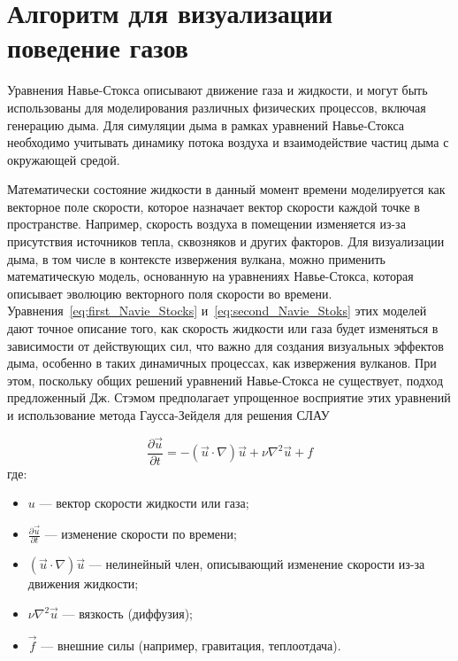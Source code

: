 \section{Алгоритм для визуализации поведение газов}
Уравнения Навье-Стокса описывают движение газа и жидкости, и могут быть использованы для моделирования различных физических процессов, включая генерацию дыма. Для симуляции дыма в рамках уравнений Навье-Стокса необходимо учитывать динамику потока воздуха и взаимодействие частиц дыма с окружающей средой.

Математически состояние жидкости в данный момент времени моделируется как векторное поле скорости, которое назначает вектор скорости каждой точке в пространстве. Например, скорость воздуха в помещении изменяется из-за присутствия источников тепла, сквозняков и других факторов. Для визуализации дыма, в том числе в контексте извержения вулкана, можно применить математическую модель, основанную на уравнениях Навье-Стокса, которая описывает эволюцию векторного поля скорости во времени. Уравнения~\ref{eq:first_Navie_Stocks} и~\ref{eq:second_Navie_Stoks} этих моделей дают точное описание того, как скорость жидкости или газа будет изменяться в зависимости от действующих сил, что важно для создания визуальных эффектов дыма, особенно в таких динамичных процессах, как извержения вулканов. При этом, поскольку общих решений уравнений Навье-Стокса не существует, подход предложенный Дж. Стэмом предполагает упрощенное восприятие этих уравнений и использование метода Гаусса-Зейделя для решения СЛАУ~\cite{lit3, stam, Gauss} 

\begin{equation}
	\label{eq:first_Navie_Stocks}
	\frac{\partial \vec{u}}{\partial t} = - (\vec{u} \cdot \nabla) \vec{u} + \nu \nabla^2 \vec{u} + f
\end{equation}
где:
\begin{itemize}
	\item $u$ — вектор скорости жидкости или газа;
	\item $\frac{\partial \vec{u}}{\partial t}$ — изменение скорости по времени;
	\item $(\vec{u} \cdot \nabla) \vec{u}$ — нелинейный член, описывающий изменение скорости из-за движения жидкости;
	\item \(\nu \nabla^2 \vec{u}\) — вязкость (диффузия);
	\item \(\vec{f}\) — внешние силы (например, гравитация, теплоотдача).
\end{itemize}

